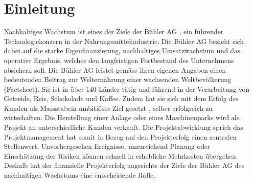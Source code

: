 \chapter{Einleitung}
\glqq Nachhaltiges Wachstum\grqq{} ist eines der Ziele der Bühler AG \citep{Buhl}, ein führender Technologiekonzern in der Nahrungsmittelindustrie. Die Bühler AG \citet{Buhl} bezieht sich dabei auf die starke Eigenfinanzierung, nachhaltiges Umsatzwachstum und das operative Ergebnis, welches den langfristigen Fortbestand des Unternehmens absichern soll. Die Bühler AG leistet gemäss ihren eigenen Angaben einen bedeutenden Beitrag zur Welternährung einer wachsenden Weltbevölkerung (Factsheet). Sie ist in über 140 Länder tätig und führend in der Verarbeitung von Getreide, Reis, Schokolade und Kaffee. Zudem hat sie sich mit dem \glqq Erfolg des Kunden als Massstab\grqq{}ein ambitiöses Ziel gesetzt \citet{Buhl}, selber erfolgreich zu wirtschaften. Die Herstellung einer Anlage oder eines Maschinenparks wird als Projekt an unterschiedliche Kunden verkauft. Die Projektabwicklung sprich das Projektmanagement hat somit in Bezug auf den Projekterfolg einen zentralen Stellenwert. Unvorhergesehen Ereignisse, unzureichend Planung oder Einschätzung der Risiken können schnell in erhebliche Mehrkosten übergehen. Deshalb hat der finanzielle Projekterfolg angesichts der Ziele der Bühler AG des nachhaltigen Wachstums eine entscheidende Rolle.
\newline\newline
